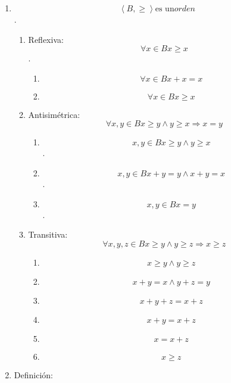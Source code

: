 \begin{enumerate}
\begin{enumerate}
\begin{enumerate}
      \[\forall x,{y \in B}{x \geq y}\Leftrightarrow{{x \cdot y} = y}\Leftrightarrow{{x + y} = x}\]
    \item
      \[\left\langle {B, \geq} \right\rangle\text{es un}\mathit{orden}\].

      \begin{enumerate}
      \def\labelenumiv{\arabic{enumiv}.}
      \item
        Reflexiva: \[\forall{x \in B}{x \geq x}\].

        \begin{enumerate}
        \def\labelenumv{\arabic{enumv}.}
        \tightlist
        \item
          \[\forall{x \in B}{{x + x} = x}\]
        \item
          \[\forall{x \in B}{x \geq x}\]
        \end{enumerate}
      \item
        Antisimétrica:
        \[\forall x,{y \in B}{{x \geq {y \land y}} \geq x}\Rightarrow{x = y}\]

        \begin{enumerate}
        \def\labelenumv{\arabic{enumv}.}
        \tightlist
        \item
          \[x,{y \in B}{{x \geq {y \land y}} \geq x}\].
        \item
          \[x,{y \in B}{{{x + y} = {{y \land x} + y}} = x}\].
        \item
          \[x,{y \in B}{x = y}\].
        \end{enumerate}
      \item
        Transitiva:
        \[\forall x,y,{z \in B}{{x \geq {y \land y}} \geq z}\Rightarrow{x \geq z}\]

        \begin{enumerate}
        \def\labelenumv{\arabic{enumv}.}
        \tightlist
        \item
          \[{x \geq {y \land y}} \geq z\]
        \item
          \[{{x + y} = {{x \land y} + z}} = y\]
        \item
          \[{{x + y} + z} = {x + z}\]
        \item
          \[{x + y} = {x + z}\]
        \item
          \[x = {x + z}\]
        \item
          \[x \geq z\]
        \end{enumerate}
      \end{enumerate}
    \item
      Definición:


\end{enumerate}
\end{enumerate}
\end{enumerate}
